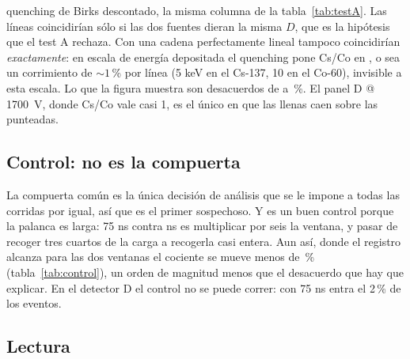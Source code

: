 \documentclass[11pt,a4paper]{article}
\begin{document}
\begin{itemize}
      quenching de Birks descontado, la misma columna de la
      tabla~\ref{tab:testA}. Las líneas coincidirían sólo si las dos fuentes
      dieran la misma $D$, que es la hipótesis que el test A rechaza. Con una
      cadena perfectamente lineal tampoco coincidirían \emph{exactamente}: en
      escala de energía depositada el quenching pone Cs/Co en \CocEsperado, o
      sea un corrimiento de $\sim 1$\,\% por línea (5 keV en el Cs-137, 10 en
      el Co-60), invisible a esta escala. Lo que la figura muestra son
      desacuerdos de \DesacMin{} a \DesacMax\,\%. El panel D @ 1700~V, donde
      Cs/Co vale casi 1, es el único en que las llenas caen sobre las
      punteadas.
\end{itemize}

\subsection{Control: no es la compuerta}

La compuerta común es la única decisión de análisis que se le impone a todas
las corridas por igual, así que es el primer sospechoso. Y es un buen control
porque la palanca es larga: 75 ns contra \PostFijo{} ns es multiplicar por seis
la ventana, y pasar de recoger tres cuartos de la carga a recogerla casi
entera. Aun así, donde el registro alcanza para las dos ventanas el cociente se
mueve menos de \ControlMax\,\% (tabla~\ref{tab:control}), un orden de magnitud
menos que el desacuerdo que hay que explicar. En el detector D el control no se
puede correr: con 75 ns entra el 2\,\% de los eventos.

\begin{table}[htbp]
\centering
\caption{El mismo test con otra compuerta, donde el registro lo permite.}
\label{tab:control}
{\small}
\end{table}

\subsection{Lectura}
\end{document}
